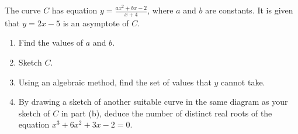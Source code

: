 \begin{problem}
    The curve $C$ has equation $y = \frac{ax^2+bx-2}{x+4}$, where $a$ and $b$ are constants. It is given that $y = 2x-5$ is an asymptote of $C$.

    \begin{enumerate}
        \item Find the values of $a$ and $b$.
        \item Sketch $C$.
        \item Using an algebraic method, find the set of values that $y$ cannot take.
        \item By drawing a sketch of another suitable curve in the same diagram as your sketch of $C$ in part (b), deduce the number of distinct real roots of the equation $x^3 + 6x^2 + 3x - 2 = 0$.
    \end{enumerate}
\end{problem}
